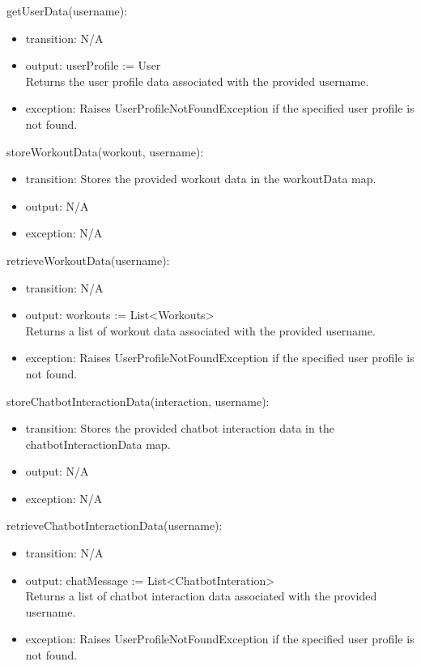 \documentclass[12pt, titlepage]{article}
\begin{document}
\noindent getUserData(username):
\begin{itemize}
\item transition: N/A
\item output: userProfile := User \\
Returns the user profile data associated with the provided username.
\item exception: Raises UserProfileNotFoundException if the specified user profile is not found.
\end{itemize}

\noindent storeWorkoutData(workout, username):
\begin{itemize}
\item transition: Stores the provided workout data in the workoutData map.
\item output: N/A
\item exception: N/A
\end{itemize}

\noindent retrieveWorkoutData(username):
\begin{itemize}
\item transition: N/A
\item output: workouts := List\textless Workouts\textgreater\\
Returns a list of workout data associated with the provided username.
\item exception: Raises UserProfileNotFoundException if the specified user profile is not found.
\end{itemize}

\noindent storeChatbotInteractionData(interaction, username):
\begin{itemize}
\item transition: Stores the provided chatbot interaction data in the chatbotInteractionData map.
\item output: N/A
\item exception: N/A
\end{itemize}

\noindent retrieveChatbotInteractionData(username):
\begin{itemize}
\item transition: N/A
\item output: chatMessage := List\textless ChatbotInteration\textgreater\\
Returns a list of chatbot interaction data associated with the provided username.
\item exception: Raises UserProfileNotFoundException if the specified user profile is not found.
\end{itemize}
\end{document}
